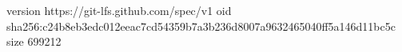 version https://git-lfs.github.com/spec/v1
oid sha256:c24b8eb3edc012eeac7cd54359b7a3b236d8007a9632465040ff5a146d11bc5c
size 699212
